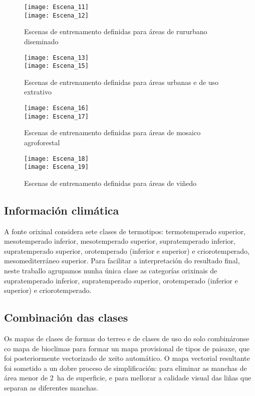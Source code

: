 \documentclass[11pt,a4paper]{article}
\begin{document}
\begin{figure}
\caption{Escenas de entrenamento definidas para áreas de rururbano diseminado}\label{fig:escenas5}
\texttt{[image: Escena\_11]}\\
\texttt{[image: Escena\_12]}
\end{figure}

\begin{figure}
\caption{Escenas de entrenamento definidas para áreas urbanas e de uso extrativo}\label{fig:escenas6}
\texttt{[image: Escena\_13]}\\
\texttt{[image: Escena\_15]}
\end{figure}

\begin{figure}
\caption{Escenas de entrenamento definidas para áreas de mosaico agroforestal}\label{fig:escenas7}
\texttt{[image: Escena\_16]}\\
\texttt{[image: Escena\_17]}
\end{figure}

\begin{figure}
\caption{Escenas de entrenamento definidas para áreas de viñedo}\label{fig:escenas8}
\texttt{[image: Escena\_18]}\\
\texttt{[image: Escena\_19]}
\end{figure}

\clearpage

\subsection{Información climática}

A fonte orixinal considera sete clases de termotipos: termotemperado superior, mesotemperado inferior, mesotemperado
superior, supratemperado inferior, supratemperado superior, orotemperado (inferior e superior) e criorotemperado, mesomediterráneo superior. Para facilitar a interpretación do resultado final, neste traballo agrupamos nunha única clase as categorías orixinais de supratemperado inferior, supratemperado superior, orotemperado (inferior e superior) e criorotemperado.

\subsection{Combinación das clases}

Os mapas de clases de formas do terreo e de clases de uso do solo combináronse co mapa de bioclimas para formar un mapa provisional de tipos de paisaxe, que foi posteriormente vectorizado de xeito automático. O mapa vectorial resultante foi sometido a un dobre proceso de simplificación: para eliminar as manchas de área menor de 2~ha de superficie, e para mellorar a calidade visual das liñas que separan as diferentes manchas.
\end{document}
